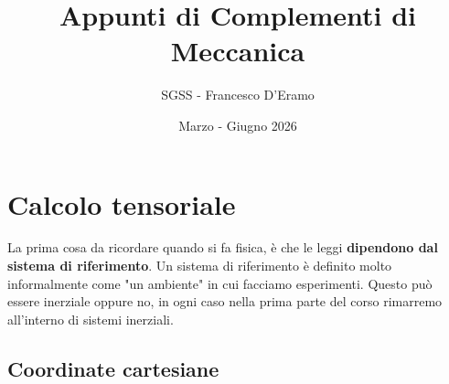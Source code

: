 \documentclass[11pt]{scrartcl}
\begin{document}
	\title{Appunti di Complementi di Meccanica}
	\subtitle{SGSS - Francesco D'Eramo}
	\date{Marzo - Giugno 2026}
	
	\maketitle
	
	\tableofcontents
	
	\newpage
	
	\section{Calcolo tensoriale}
	
	La prima cosa da ricordare quando si fa fisica, è che le leggi \textbf{dipendono dal sistema di riferimento}. Un sistema di riferimento è definito molto informalmente come "un ambiente" in cui facciamo esperimenti. Questo può essere inerziale oppure no, in ogni caso nella prima parte del corso rimarremo all'interno di sistemi inerziali.
	
	\subsection{Coordinate cartesiane}
	
\end{document}
